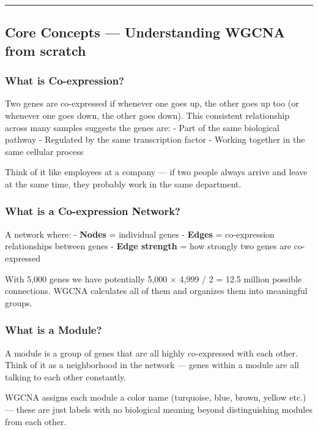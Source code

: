 \documentclass[
]{article}
\begin{document}
\begin{center}\rule{0.5\linewidth}{0.5pt}\end{center}

\subsection{Core Concepts --- Understanding WGCNA from
scratch}\label{core-concepts-understanding-wgcna-from-scratch}

\subsubsection{What is Co-expression?}\label{what-is-co-expression}

Two genes are co-expressed if whenever one goes up, the other goes up
too (or whenever one goes down, the other goes down). This consistent
relationship across many samples suggests the genes are: - Part of the
same biological pathway - Regulated by the same transcription factor -
Working together in the same cellular process

Think of it like employees at a company --- if two people always arrive
and leave at the same time, they probably work in the same department.

\subsubsection{What is a Co-expression
Network?}\label{what-is-a-co-expression-network}

A network where: - \textbf{Nodes} = individual genes - \textbf{Edges} =
co-expression relationships between genes - \textbf{Edge strength} = how
strongly two genes are co-expressed

With 5,000 genes we have potentially 5,000 × 4,999 / 2 = 12.5 million
possible connections. WGCNA calculates all of them and organizes them
into meaningful groups.

\subsubsection{What is a Module?}\label{what-is-a-module}

A module is a group of genes that are all highly co-expressed with each
other. Think of it as a neighborhood in the network --- genes within a
module are all talking to each other constantly.

WGCNA assigns each module a color name (turquoise, blue, brown, yellow
etc.) --- these are just labels with no biological meaning beyond
distinguishing modules from each other.
\end{document}
